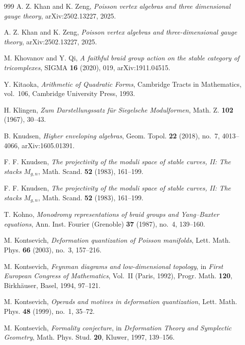 \begin{thebibliography}{999}
A. Z. Khan and K. Zeng, \emph{Poisson vertex algebras and three dimensional gauge theory}, arXiv:2502.13227, 2025.

A. Z. Khan and K. Zeng, \emph{Poisson vertex algebras and three-dimensional gauge theory}, arXiv:2502.13227, 2025.

M. Khovanov and Y. Qi, \emph{A faithful braid group action on the stable category of tricomplexes}, SIGMA \textbf{16} (2020), 019, arXiv:1911.04515.

Y. Kitaoka, \emph{Arithmetic of Quadratic Forms}, Cambridge Tracts in Mathematics, vol.~106, Cambridge University Press, 1993.

H. Klingen, \emph{Zum Darstellungssatz f\"ur Siegelsche Modulformen}, Math. Z. \textbf{102} (1967), 30--43.

B. Knudsen, \emph{Higher enveloping algebras}, Geom. Topol. \textbf{22} (2018), no.~7, 4013--4066, arXiv:1605.01391.

F. F. Knudsen, \emph{The projectivity of the moduli space of stable curves, II: The stacks $M_{g,n}$}, Math. Scand. \textbf{52} (1983), 161--199.

F. F. Knudsen, \emph{The projectivity of the moduli space of stable curves, II: The stacks $M_{g,n}$}, Math. Scand. \textbf{52} (1983), 161--199.

T. Kohno, \emph{Monodromy representations of braid groups and Yang--Baxter equations}, Ann. Inst. Fourier (Grenoble) \textbf{37} (1987), no.~4, 139--160.

M. Kontsevich, \emph{Deformation quantization of Poisson manifolds}, Lett. Math. Phys. \textbf{66} (2003), no.~3, 157--216.

M. Kontsevich, \emph{Feynman diagrams and low-dimensional topology}, in \emph{First European Congress of Mathematics}, Vol.~II (Paris, 1992), Progr. Math. \textbf{120}, Birkh\"auser, Basel, 1994, 97--121.

M. Kontsevich, \emph{Operads and motives in deformation quantization}, Lett. Math. Phys. \textbf{48} (1999), no.~1, 35--72.

M. Kontsevich, \emph{Formality conjecture}, in \emph{Deformation Theory and Symplectic Geometry}, Math. Phys. Stud. \textbf{20}, Kluwer, 1997, 139--156.


\end{thebibliography}

